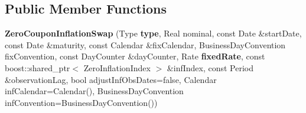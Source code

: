 \subsection*{Public Member Functions}
\begin{DoxyCompactItemize}
\item 
{\bfseries Zero\+Coupon\+Inflation\+Swap} (Type {\bf type}, Real nominal, const Date \&start\+Date, const Date \&maturity, const Calendar \&fix\+Calendar, Business\+Day\+Convention fix\+Convention, const Day\+Counter \&day\+Counter, Rate {\bf fixed\+Rate}, const boost\+::shared\+\_\+ptr$<$ Zero\+Inflation\+Index $>$ \&inf\+Index, const Period \&observation\+Lag, bool adjust\+Inf\+Obs\+Dates=false, Calendar inf\+Calendar=Calendar(), Business\+Day\+Convention inf\+Convention=Business\+Day\+Convention())\label{class_quant_lib_1_1_zero_coupon_inflation_swap_a4630181576ac237dce6ad96aadab7a98}

\end{DoxyCompactItemize}
